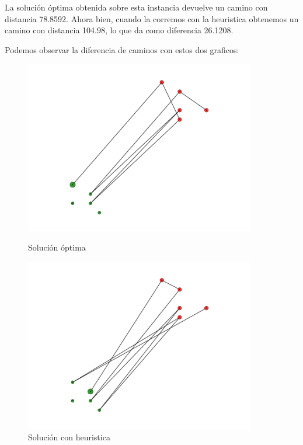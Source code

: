 \newpage
La solución óptima obtenida sobre esta instancia devuelve un camino con distancia 78.8592.
Ahora bien, cuando la corremos con la heuristica obtenemos un camino con distancia 104.98, lo que da como diferencia 26.1208.

Podemos observar la diferencia de caminos con estos dos graficos:

\begin{figure}[H]
\centering
\begin{minipage}{0.45\textwidth}
\includegraphics[width=0.9\textwidth]{imagenes/test1-soltest1BT.pdf}
\caption{Solución óptima}
\label{fig:ej2_caso1bt}
\end{minipage}
\qquad
\begin{minipage}{0.45\textwidth}
\includegraphics[width=0.9\textwidth]{imagenes/test1-soltest1H.pdf}
\caption{Solución con heuristica}
\label{fig:ej2_caso1h}
\end{minipage}
\end{figure}

